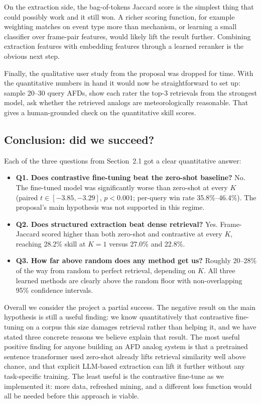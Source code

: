 \documentclass[11pt]{article}
\begin{document}
On the extraction side, the bag-of-tokens Jaccard score is the simplest thing that could possibly work and it still won. A richer scoring function, for example weighting matches on event type more than mechanism, or learning a small classifier over frame-pair features, would likely lift the result further. Combining extraction features with embedding features through a learned reranker is the obvious next step.

Finally, the qualitative user study from the proposal was dropped for time. With the quantitative numbers in hand it would now be straightforward to set up: sample 20--30 query AFDs, show each rater the top-3 retrievals from the strongest model, ask whether the retrieved analogs are meteorologically reasonable. That gives a human-grounded check on the quantitative skill scores.

\subsection{Conclusion: did we succeed?}
Each of the three questions from Section~2.1 got a clear quantitative answer:

\begin{itemize}
  \item \textbf{Q1. Does contrastive fine-tuning beat the zero-shot baseline?} No. The fine-tuned model was significantly worse than zero-shot at every \(K\) (paired \(t \in [-3.85, -3.29]\), \(p<0.001\); per-query win rate 35.8\%--46.4\%). The proposal's main hypothesis was not supported in this regime.
  \item \textbf{Q2. Does structured extraction beat dense retrieval?} Yes. Frame-Jaccard scored higher than both zero-shot and contrastive at every \(K\), reaching 28.2\% skill at \(K{=}1\) versus 27.0\% and 22.8\%.
  \item \textbf{Q3. How far above random does any method get us?} Roughly 20--28\% of the way from random to perfect retrieval, depending on \(K\). All three learned methods are clearly above the random floor with non-overlapping 95\% confidence intervals.
\end{itemize}

Overall we consider the project a partial success. The negative result on the main hypothesis is still a useful finding: we know quantitatively that contrastive fine-tuning on a corpus this size damages retrieval rather than helping it, and we have stated three concrete reasons we believe explain that result. The most useful positive finding for anyone building an AFD analog system is that a pretrained sentence transformer used zero-shot already lifts retrieval similarity well above chance, and that explicit LLM-based extraction can lift it further without any task-specific training. The least useful is the contrastive fine-tune as we implemented it: more data, refreshed mining, and a different loss function would all be needed before this approach is viable.
\end{document}
